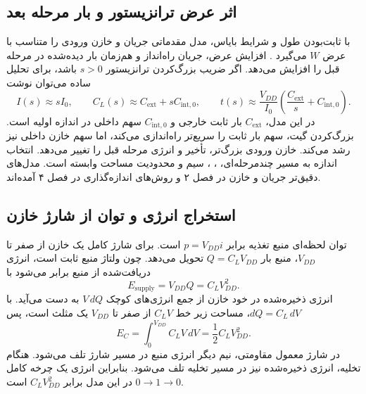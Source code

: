 \subsection{اثر عرض ترانزیستور و بار مرحله بعد}
با ثابت‌بودن طول و شرایط بایاس، مدل مقدماتی جریان و خازن ورودی را متناسب با عرض
\(W\) می‌گیرد \cite[صفحه ۴۲]{weste}. افزایش عرض، جریان راه‌انداز و هم‌زمان بار
دیده‌شده در مرحله قبل را افزایش می‌دهد. اگر ضریب بزرگ‌کردن ترانزیستور \(s>0\)
باشد، برای تحلیل ساده می‌توان نوشت
\begin{equation}
 I(s)\approx sI_0,\qquad
 C_L(s)\approx C_{\mathrm{ext}}+sC_{\mathrm{int},0},\qquad
 t(s)\approx\frac{V_{DD}}{I_0}
 \left(\frac{C_{\mathrm{ext}}}{s}+C_{\mathrm{int},0}\right).
 \label{eq:impl-sizing}
\end{equation}
در این مدل، \(C_{\mathrm{ext}}\) بار ثابت خارجی و \(C_{\mathrm{int},0}\) سهم داخلی
در اندازه اولیه است. بزرگ‌کردن گیت، سهم بار ثابت را سریع‌تر راه‌اندازی می‌کند، اما
سهم خازن داخلی نیز رشد می‌کند. خازن ورودی بزرگ‌تر، تأخیر و انرژی مرحله قبل را تغییر
می‌دهد. انتخاب اندازه به مسیر چندمرحله‌ای، ، ، سیم و محدودیت
مساحت وابسته است. مدل‌های دقیق‌تر جریان و خازن در فصل ۲ و روش‌های اندازه‌گذاری در فصل ۴ آمده‌اند.

\subsection{استخراج انرژی و توان از شارژ خازن}
توان لحظه‌ای منبع تغذیه برابر \(p=V_{DD}i\) است. برای شارژ کامل یک خازن از صفر
تا \(V_{DD}\)، منبع بار \(Q=C_LV_{DD}\) تحویل می‌دهد. چون ولتاژ منبع ثابت است،
انرژی دریافت‌شده از منبع برابر می‌شود با
\begin{equation}
 E_{\mathrm{supply}}=V_{DD}Q=C_LV_{DD}^2.
 \label{eq:impl-supply-energy}
\end{equation}
انرژی ذخیره‌شده در خود خازن از جمع انرژی‌های کوچک \(V\,dQ\) به دست می‌آید.
با \(dQ=C_L\,dV\)، مساحت زیر خط \(C_LV\) از صفر تا \(V_{DD}\) یک مثلث است، پس
\begin{equation}
 E_C=\int_0^{V_{DD}}C_LV\,dV=\frac12 C_LV_{DD}^2.
 \label{eq:impl-stored-energy}
\end{equation}
در شارژ معمول مقاومتی، نیم دیگر انرژی منبع در مسیر شارژ تلف می‌شود. هنگام تخلیه،
انرژی ذخیره‌شده نیز در مسیر تخلیه تلف می‌شود. بنابراین انرژی یک چرخه کامل
\(0\rightarrow1\rightarrow0\) در این مدل برابر \(C_LV_{DD}^2\) است.


